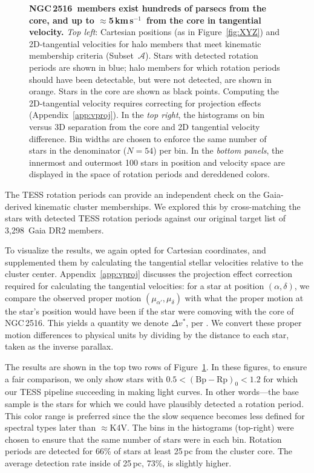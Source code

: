 \documentclass[12pt,twocolumn,tighten]{aastex63}
\newcommand{\cn}{NGC\,2516} %
\newcommand{\nkinematic}{3{,}298} %
\newcommand{\kms}{\,km\,s$^{-1}$}
\newcommand{\bpmrp}{(\mathrm{Bp}-\mathrm{Rp})_0}
\begin{document}
\begin{figure}[t]
\begin{center}
	\end{center}
	\vspace{-0.7cm}
  \caption{ 
  {\bf \cn\ members exist hundreds of parsecs from the core, and up
  to $\approx$5\kms\ from the core in tangential velocity.} {\it Top
  left}: Cartesian positions (as in Figure~\ref{fig:XYZ}) and
  2D-tangential velocities for halo members that meet kinematic
  membership criteria (Subset~$\mathcal{A}$).  Stars with detected
  rotation periods are shown in blue;  halo members for which rotation
  periods should have been detectable, but were not detected, are
  shown in orange.  Stars in the core are shown as black points.
  Computing the 2D-tangential velocity requires correcting for
  projection effects (Appendix~\ref{app:vproj}).  In the {\it top
  right}, the histograms on bin versus 3D separation from the core and
  2D tangential velocity difference.  Bin widths are chosen to enforce
  the same number of stars in the denominator ($N=54$) per bin.  In the
  {\it bottom panels}, the innermost and outermost 100 stars in
  position and velocity space are displayed in the space of rotation
  periods and dereddened colors.
  \label{fig:physical_x_rotn}
	}
\end{figure}

The TESS rotation periods can provide an independent check on the
Gaia-derived kinematic cluster memberships.  We explored this by
cross-matching the stars with detected TESS rotation periods against
our original target list of \nkinematic\ Gaia DR2 members.  

To visualize the results, we again opted for Cartesian coordinates,
and supplemented them by calculating the tangential stellar velocities
relative to the cluster center.  Appendix~\ref{app:vproj} discusses
the projection effect correction required for calculating the
tangential velocities: for a star at position $(\alpha, \delta)$, we
compare the observed proper motion $(\mu_{\alpha'}, \mu_\delta)$ with
what the proper motion at the star's position would have been if the
star were comoving with the core of \cn.  This yields a quantity we
denote $\Delta v^{*}$, per .  We convert
these proper motion differences to physical units by dividing by the
distance to each star, taken as the inverse parallax.  

The results are shown in the top two rows of
Figure~\ref{fig:physical_x_rotn}.  In these figures, to ensure a fair
comparison, we only show stars with $0.5<\bpmrp<1.2$ for which our
TESS pipeline succeeding in making light curves.  In other words---the
base sample is the stars for which we could have plausibly detected a
rotation period.  This color range is preferred since the the slow
sequence becomes less defined for spectral types later than
$\approx$K4V.  The bins in the histograms (top-right) were chosen to
ensure that the same number of stars were in each bin.  Rotation
periods are detected for 66\% of stars at least 25\,pc from the
cluster core.  The average detection rate inside of 25\,pc, 73\%, is
slightly higher.
\end{document}

